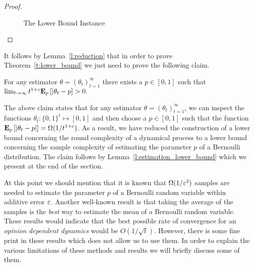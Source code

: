 \begin{proof}
\begin{figure}
    \centering
    \vspace{-10mm}
    \caption{The Lower Bound Instance} \label{fig:lb_instance}
  \end{figure}
\end{proof}
%
It follows by Lemma~\ref{l:reduction} that in order to prove Theorem~\ref{t:lower_bound} we
just need to prove the following claim.
\begin{claim}\label{cl:fixed_p}
  For any estimator $\theta = (\theta_t)_{t=1}^\infty$
  there exists a $p \in [0,1]$ such that
  \(
    \lim_{t \to \infty} t^{1+c} \bm{\mathrm{E}}_{p} \left[ |\theta_t - p \right] > 0.
  \)
\end{claim}
The above claim states that for any estimator $\theta=(\theta_t)_{t=1}^\infty$,
we can inspect the functions $\theta_t: \{0,1\}^t \mapsto [0,1]$ and then choose
a $p \in [0,1]$ such that the function $\bm{\mathrm{E}}_{p} \left[ |\theta_t-p| \right]= \Omega(1/t^{1+c})$. As
a result, we have reduced the construction of a lower bound concerning the round
complexity of a dynamical process to a lower bound concerning the sample complexity of
estimating the parameter $p$ of a Bernoulli distribution. The claim follows by
Lemma~\ref{l:estimation_lower_bound} which we present at the end of the section.

At this point we should mention that it is known
that $\Omega(1/\varepsilon^2)$ samples are needed to estimate the parameter $p$
of a Bernoulli random variable within additive error $\varepsilon$.
Another well-known result is that taking the average of the samples
is the \emph{best} way to estimate the mean of a Bernoulli random variable.
These results would indicate that the best possible rate of convergence
for an \emph{opinion dependent dynamics} would be $O(1/\sqrt{t})$.
However, there is some fine print in these results which does not allow us
to use them. In order to explain the various limitations of
these methods and results we will briefly discuss some of them.

